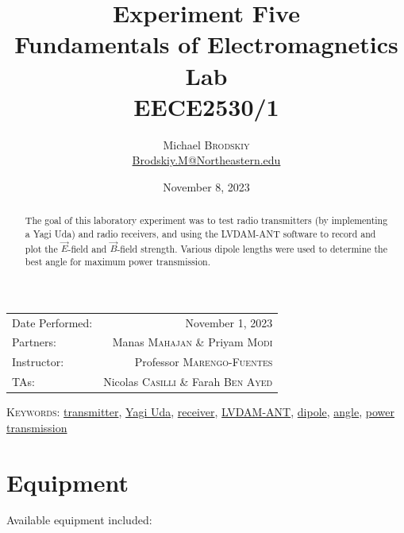 \documentclass[
	letterpaper, %
	10pt, %
]{CSUniSchoolLabReport}
\title{Experiment Five\\ Fundamentals of Electromagnetics Lab \\ EECE2530/1} %
\author{Michael \textsc{Brodskiy}\\ \small \href{mailto:Brodskiy.M@Northeastern.edu}{Brodskiy.M@Northeastern.edu}}
\date{November 8, 2023} %
\begin{document}
\maketitle %

\begin{center}
	\begin{tabular}{l r}
		Date Performed: & November 1, 2023 \\ %
        Partners: & Manas \textsc{Mahajan} \& Priyam \textsc{Modi} \\ %
		Instructor: & Professor \textsc{Marengo-Fuentes} \\ %
        TAs: & Nicolas \textsc{Casilli} \& Farah \textsc{Ben Ayed} \\ %
	\end{tabular}
\end{center}

\newpage

\begin{abstract}

  The goal of this laboratory experiment was to test radio transmitters (by implementing a Yagi Uda) and radio receivers, and using the LVDAM-ANT software to record and plot the $\vec{E}$-field and $\vec{B}$-field strength. Various dipole lengths were used to determine the best angle for maximum power transmission.

\end{abstract}

\begin{flushleft}

  \textsc{Keywords:} \underline{transmitter}, \underline{Yagi Uda}, \underline{receiver}, \underline{LVDAM-ANT}, \underline{dipole}, \underline{angle}, \underline{power transmission}

\end{flushleft}

\newpage

\section{Equipment}

\hspace{.5 in} Available equipment included:\\
\end{document}
